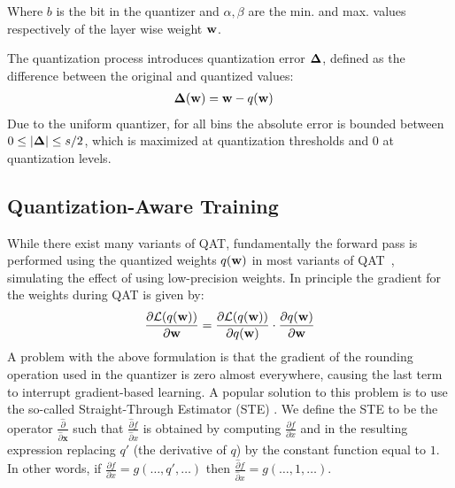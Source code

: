 Where $b$ is the bit in the quantizer and $\alpha, \beta$ are the min. and max. values respectively of the layer wise weight $\mathbf{w}$.

The quantization process introduces quantization error $\mathbf{\Delta}$, defined as the difference between the original and quantized values:
\begin{align}
    \mathbf{\Delta}(\mathbf{w}) &= \mathbf{w} - q(\mathbf{w})
\end{align}
Due to the uniform quantizer, for all bins the absolute error is bounded between $0 \leq |\mathbf{\Delta}| \leq s/2$, which is maximized at quantization thresholds and 0 at quantization levels.

\subsection{Quantization-Aware Training}
While there exist many variants of QAT, fundamentally the forward pass is performed using the quantized weights $q(\mathbf{w})$ in most variants of QAT~\cite{jacob2017quantization,krishnamoorthi2018quantizing}, simulating the effect of using low-precision weights. In principle the gradient for the weights during QAT is given by:
\begin{equation}
\begin{aligned}
    \label{eq:qat_ste}
    \frac{\partial \mathcal{L}(q(\mathbf{w}))}{\partial\mathbf{w}}  = \frac{\partial \mathcal{L}(q(\mathbf{w}))}{\partial q(\mathbf{w})} \cdot \frac{\partial q(\mathbf{w})}{\partial\mathbf{w}}
\end{aligned}
\end{equation}
A problem with the above formulation is that the gradient of the rounding operation used in the quantizer is zero almost everywhere, causing the last term to interrupt gradient-based learning. A popular solution to this problem is to use the so-called Straight-Through Estimator (STE) \cite{bengio2013ste}. We define the STE to be the operator $\frac{\hat\partial}{\hat\partial \mathbf{x}}$ such that $\frac{\hat\partial f}{\hat\partial x}$ is obtained by computing $\frac{\partial f}{\partial x}$ and in the resulting expression replacing $q'$ (the derivative of $q$) by the constant function equal to $1$. In other words, if $\frac{\partial f}{\partial x} = g(\ldots, q', \ldots)$ then $\frac{\hat\partial f}{\hat\partial x} = g(\ldots, 1, \ldots)$.


